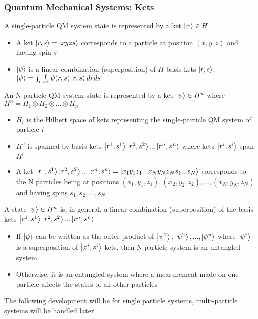 \documentclass[8pt,t,mathserif,aspectratio=169]{beamer}
\begin{document}
\begin{frame}
  \frametitle{Quantum Mechanical Systems: Kets}
  \vspace{1mm}
  A single-particle QM system state is represented by a ket $\ket{\psi} \in H$
  \begin{itemize}
    \item A ket $\ket{r,s} = \ket{x y z s}$ corresponds to a particle at position $(x,y,z)$ and having spin $s$
    \item $\ket{\psi}$ is a linear combination (superposition) of $H$ basis kets $\ket{r,s}$: $\ket{\psi} = \int_r \int_s \psi(r,s) \ket{r,s} dr ds$
  \end{itemize}
  An N-particle QM system state is represented by a ket $\ket{\psi} \in H^n$ where $H^n = H_1 \otimes H_2 \otimes ... \otimes H_n$
  \begin{itemize}
    \item $H_i$ is the Hilbert space of kets representing the single-particle QM system of particle $i$
    \item $H^n$ is spanned by basis kets $\ket{r^1,s^1} \ket{r^2,s^2} ... \ket{r^n,s^n}$ where kets $\ket{r^i,s^i}$ span $H^i$
    \item A ket $\ket{r^1,s^1} \ket{r^2,s^2} ... \ket{r^n,s^n} = \ket{x_1 y_1 z_1 ... x_N y_N z_N s_1 ... s_N}$ corresponds to the N particles being at positions $(x_1,y_1,z_1), (x_2,y_2,z_2), ..., (x_N,y_N,z_N)$ and having spins $s_1,s_2,...,s_N$
  \end{itemize}
  A state $\ket{\psi} \in H^n$ is, in general, a linear combination (superposition) of the basis kets $\ket{r^1,s^1} \ket{r^2,s^2} ... \ket{r^n,s^n}$
  \begin{itemize}
    \item If $\ket{\psi}$ can be written as the outer product of $\ket{\psi^1}, \ket{\psi^2}, ..., \ket{\psi^n}$ where $\ket{\psi^i}$ is a superposition of $\ket{x^i,s^i}$ kets, then N-particle system is an untangled system 
    \item Otherwise, it is an entangled system where a measurement made on one particle affects the states of all other particles 
  \end{itemize}
  The following development will be for single particle systems, multi-particle systems will be handled later
\end{frame}
\end{document}
